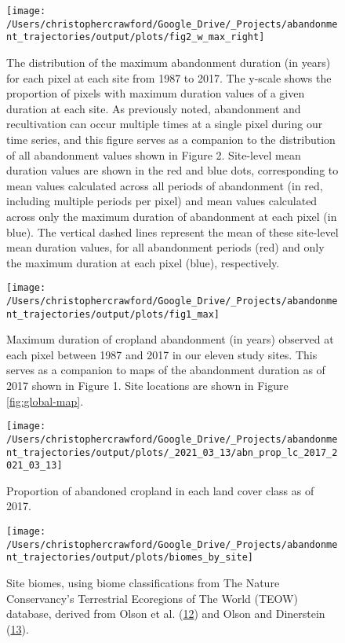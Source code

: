 \documentclass[9pt,lineno]{pnas-new}
\begin{document}
\begin{figure}
\texttt{[image: /Users/christophercrawford/Google\_Drive/\_Projects/abandonment\_trajectories/output/plots/fig2\_w\_max\_right]} \caption{The distribution of the maximum abandonment duration (in years) for each pixel at each site from 1987 to 2017. The y-scale shows the proportion of pixels with maximum duration values of a given duration at each site. As previously noted, abandonment and recultivation can occur multiple times at a single pixel during our time series, and this figure serves as a companion to the distribution of all abandonment values shown in Figure 2. Site-level mean duration values are shown in the red and blue dots, corresponding to mean values calculated across all periods of abandonment (in red, including multiple periods per pixel) and mean values calculated across only the maximum duration of abandonment at each pixel (in blue). The vertical dashed lines represent the mean of these site-level mean duration values, for all abandonment periods (red) and only the maximum duration at each pixel (blue), respectively.}\label{fig:mean-abn-duration-w-max}
\end{figure}



\begin{figure}
\texttt{[image: /Users/christophercrawford/Google\_Drive/\_Projects/abandonment\_trajectories/output/plots/fig1\_max]} \caption{Maximum duration of cropland abandonment (in years) observed at each pixel between 1987 and 2017 in our eleven study sites. This serves as a companion to maps of the abandonment duration as of 2017 shown in Figure 1. Site locations are shown in Figure \ref{fig:global-map}.}\label{fig:maps-max-abn-duration}
\end{figure}



\begin{figure}
\texttt{[image: /Users/christophercrawford/Google\_Drive/\_Projects/abandonment\_trajectories/output/plots/\_2021\_03\_13/abn\_prop\_lc\_2017\_2021\_03\_13]} \caption{Proportion of abandoned cropland in each land cover class as of 2017.}\label{fig:abn-prop-lc}
\end{figure}



\begin{figure}
\texttt{[image: /Users/christophercrawford/Google\_Drive/\_Projects/abandonment\_trajectories/output/plots/biomes\_by\_site]} \caption{Site biomes, using biome classifications from The Nature Conservancy's Terrestrial Ecoregions of The World (TEOW) database, derived from Olson et al. (\protect\hyperlink{ref-Olson2001}{12}) and Olson and Dinerstein (\protect\hyperlink{ref-Olson2002}{13}).}\label{fig:site-biomes}
\end{figure}
\end{document}
